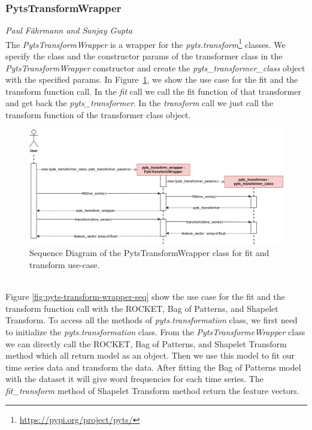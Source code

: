 \subsubsection*{PytsTransformWrapper}
\vspace*{-10mm}\hfill{\normalsize\emph{Paul Fährmann and Sanjay Gupta}}
\\
The \textit{PytsTransformWrapper} is a wrapper for the \textit{pyts.transform}\footnote{\href{https://pypi.org/project/pyts/}{https://pypi.org/project/pyts/}} classes. We specify the class and the constructor params of the transformer class in the \textit{PytsTransformWrapper} constructor and create the \textit{pyts\_transformer\_class} object with the specified params. In Figure~\ref{fig:tfe-pyts-transform-seq}, we show the use case for the fit and the transform function call. In the \textit{fit} call we call the fit function of that transformer and get back the \textit{pyts\_transformer}. In the \textit{transform} call we just call the transform function of the transformer class object.
\begin{figure}[ht]
    \centering
    \includegraphics[width=\textwidth]{gfx/pyts_transform_sequence}
    \caption{Sequence Diagram of the PytsTransformWrapper class for fit and transform use-case.}
    \label{fig:tfe-pyts-transform-seq}
\end{figure}
\\
Figure \ref{fig:pyts-transform-wrapper-seq} show the use case for the fit and the transform function call with the ROCKET, Bag of Patterns, and Shapelet Transform. To access all the methods of \textit{pyts.transformation} class, we first need to initialize the \textit{pyts.transformation} class. From the \textit{PytsTransformeWrapper} class we can directly call the ROCKET, Bag of Patterns, and Shapelet Transform method which all return model as an object. Then we use this model to fit our time series data and transform the data. After fitting the Bag of Patterns model with the dataset it will give word frequencies for each time series. The \textit {fit\_transform} method of Shapelet Transform method return the feature vectors.
